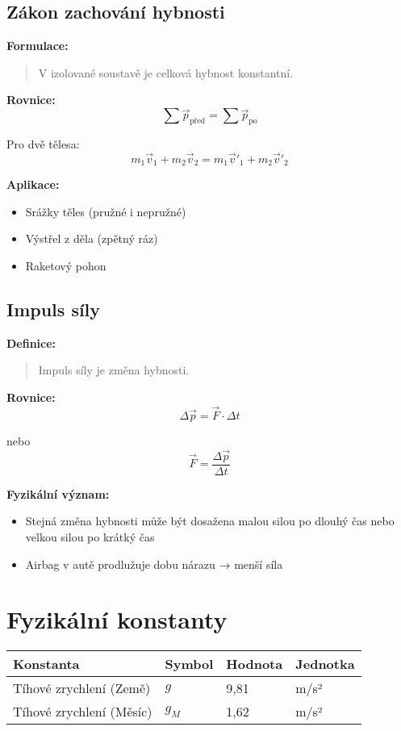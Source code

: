 \documentclass[11pt,a4paper]{article}
\begin{document}
\subsection{Zákon zachování hybnosti}

\textbf{Formulace:}
\begin{quote}
V izolované soustavě je celková hybnost konstantní.
\end{quote}

\textbf{Rovnice:}
\[\sum \vec{p}_{\text{před}} = \sum \vec{p}_{\text{po}}\]

Pro dvě tělesa:
\[m_1 \vec{v}_1 + m_2 \vec{v}_2 = m_1 \vec{v}'_1 + m_2 \vec{v}'_2\]

\textbf{Aplikace:}
\begin{itemize}
\item Srážky těles (pružné i nepružné)
\item Výstřel z děla (zpětný ráz)
\item Raketový pohon
\end{itemize}

\subsection{Impuls síly}

\textbf{Definice:}
\begin{quote}
Impuls síly je změna hybnosti.
\end{quote}

\textbf{Rovnice:}
\[\Delta \vec{p} = \vec{F} \cdot \Delta t\]

nebo
\[\vec{F} = \frac{\Delta \vec{p}}{\Delta t}\]

\textbf{Fyzikální význam:}
\begin{itemize}
\item Stejná změna hybnosti může být dosažena malou silou po dlouhý čas nebo velkou silou po krátký čas
\item Airbag v autě prodlužuje dobu nárazu → menší síla
\end{itemize}

\clearpage

\section{Fyzikální konstanty}

\begin{longtable}{llll}
\toprule
Konstanta & Symbol & Hodnota & Jednotka \\
\midrule
Tíhové zrychlení (Země) & $g$ & 9,81 & m/s² \\
Tíhové zrychlení (Měsíc) & $g_M$ & 1,62 & m/s² \\
\bottomrule
\end{longtable}
\end{document}
